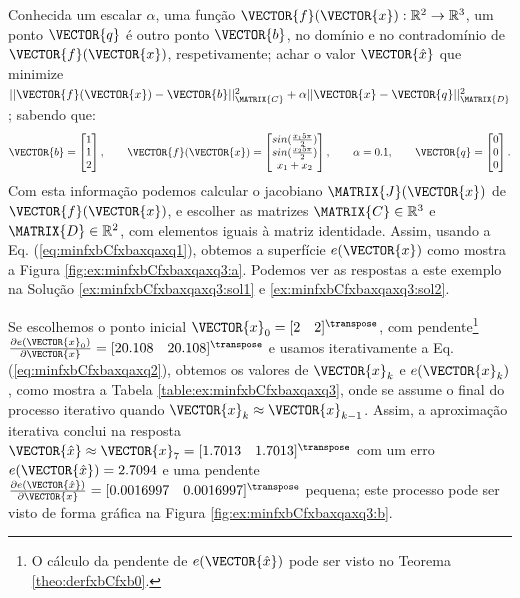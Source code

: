 \begin{example}
\label{ex:minfxbCfxbaxqaxq1}
Conhecida um escalar $\alpha$, uma função $\VECTOR{f}(\VECTOR{x}) : \mathbb{R}^{2} \rightarrow \mathbb{R}^{3}$,
um ponto $\VECTOR{q}$
é outro ponto $\VECTOR{b}$, no domínio e no contradomínio de $\VECTOR{f}(\VECTOR{x})$, respetivamente;
achar o valor $\VECTOR{\hat{x}}$ que minimize 
$||\VECTOR{f}(\VECTOR{x})-\VECTOR{b}||_{\MATRIX{C}}^2+\alpha||\VECTOR{x}-\VECTOR{q}||_{\MATRIX{D}}^2$;
sabendo que:
\begin{equation}
\VECTOR{b}=\begin{bmatrix}
1\\
1\\
2
\end{bmatrix},
\qquad 
\VECTOR{f}(\VECTOR{x})=\begin{bmatrix}
sin(\frac{x_1 5 \pi}{2})\\
sin(\frac{x_2 5 \pi}{2})\\
x_1+x_2
\end{bmatrix},
\qquad
\alpha=0.1,
\qquad
\VECTOR{q}=\begin{bmatrix}
0\\
0\\
0
\end{bmatrix}.
\end{equation}
Com esta informação podemos calcular o jacobiano $\MATRIX{J}(\VECTOR{x})$ de $\VECTOR{f}(\VECTOR{x})$,
 e escolher as matrizes $\MATRIX{C} \in \mathbb{R}^{3}$ e $\MATRIX{D} \in \mathbb{R}^{2}$, 
com elementos iguais à  matriz identidade. 
Assim, usando a Eq. (\ref{eq:minfxbCfxbaxqaxq1}),
obtemos a superfície $e(\VECTOR{x})$ como mostra a Figura \ref{fig:ex:minfxbCfxbaxqaxq3:a}.
Podemos ver as respostas a este exemplo na Solução \ref{ex:minfxbCfxbaxqaxq3:sol1} e \ref{ex:minfxbCfxbaxqaxq3:sol2}.
\end{example}

\begin{SolutionT}
\label{ex:minfxbCfxbaxqaxq3:sol1}
Se escolhemos o ponto inicial $\VECTOR{x}_0=[2\quad 2]^{\transpose}$,
com pendente\footnote{O cálculo da
pendente de $e(\VECTOR{\hat{x}})$ pode ser visto no Teorema \ref{theo:derfxbCfxb0}.} 
$\frac{\partial e(\VECTOR{x}_0)}{\partial \VECTOR{x} }=[20.108\quad 20.108]^{\transpose}$ e 
usamos iterativamente a Eq. (\ref{eq:minfxbCfxbaxqaxq2}), obtemos os valores 
de $\VECTOR{x}_k$ e $e(\VECTOR{x}_k)$, como mostra a Tabela \ref{table:ex:minfxbCfxbaxqaxq3},
onde se assume o final do processo iterativo quando $\VECTOR{x}_k \approx \VECTOR{x}_{k-1}$.
Assim, a aproximação iterativa conclui na resposta 
$\VECTOR{\hat{x}}\approx \VECTOR{x}_{7} =[1.7013\quad 1.7013]^{\transpose}$
com um erro $e(\VECTOR{\hat{x}})=2.7094$ e uma pendente
$\frac{\partial e(\VECTOR{\hat{x}})}{\partial \VECTOR{x} }=[0.0016997\quad 0.0016997]^{\transpose}$
pequena;
este processo pode ser visto de forma gráfica na Figura \ref{fig:ex:minfxbCfxbaxqaxq3:b}.
\end{SolutionT}

